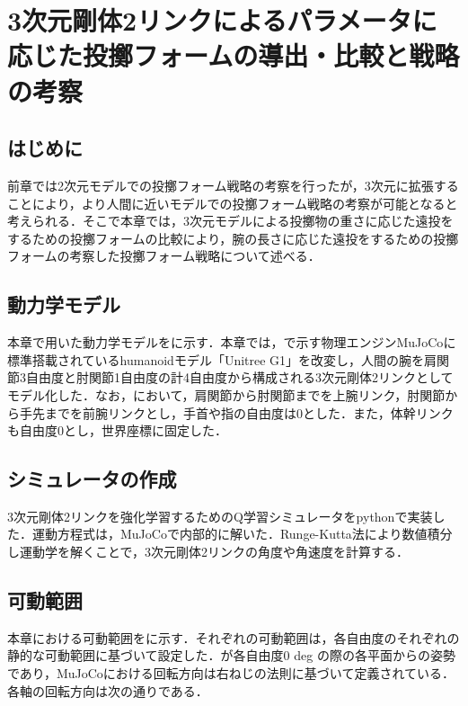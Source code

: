 
\chapter[3次元剛体2リンクによるパラメータに応じた投擲フォームの導出・比較と戦略の考察]{3次元剛体2リンクによるパラメータに応じた投擲フォームの導出・比較と戦略の考察}

\section{はじめに}
前章では2次元モデルでの投擲フォーム戦略の考察を行ったが，3次元に拡張することにより，より人間に近いモデルでの投擲フォーム戦略の考察が可能となると考えられる．そこで本章では，3次元モデルによる投擲物の重さに応じた遠投をするための投擲フォームの比較により，腕の長さに応じた遠投をするための投擲フォームの考察した投擲フォーム戦略について述べる．
\section{動力学モデル}
本章で用いた動力学モデルをに示す．本章では，で示す物理エンジンMuJoCo\cite{mujoco}\cite{mujoco2}に標準搭載されているhumanoidモデル「Unitree G1」\cite{unitreeg1}を改変し，人間の腕を肩関節3自由度と肘関節1自由度の計4自由度から構成される3次元剛体2リンクとしてモデル化した．なお，において，肩関節から肘関節までを上腕リンク，肘関節から手先までを前腕リンクとし，手首や指の自由度は0とした．また，体幹リンクも自由度0とし，世界座標に固定した．


\section{シミュレータの作成}
3次元剛体2リンクを強化学習するためのQ学習シミュレータをpythonで実装した．運動方程式は，MuJoCoで内部的に解いた．Runge-Kutta法により数値積分し運動学を解くことで，3次元剛体2リンクの角度や角速度を計算する．
\section{可動範囲}
本章における可動範囲をに示す．それぞれの可動範囲は，各自由度のそれぞれの静的な可動範囲\cite{range}に基づいて設定した．が各自由度0 deg の際の各平面からの姿勢であり，MuJoCoにおける回転方向は右ねじの法則に基づいて定義されている．各軸の回転方向は次の通りである．

